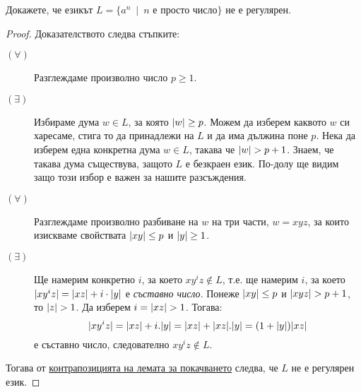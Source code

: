 \begin{extra}
\begin{problem}
  Докажете, че езикът $L = \{a^n\ \mid\ n\mbox{ е просто число}\}$ не е регулярен.
\end{problem}
\begin{proof}
  Доказателството следва стъпките:
  \begin{description}
  \item[$(\forall)$] 
    Разглеждаме произволно число $p \geq 1$.
  \item[$(\exists)$]
    Избираме дума $w \in L$, за която $\vert{w}\vert \geq p$. Можем да изберем каквото $w$ 
    си харесаме, стига то да принадлежи на $L$ и да има дължина поне $p$.
    Нека да изберем една конкретна дума $w \in L$, такава че $\vert{w}\vert > p+1$.
    Знаем, че такава дума съществува, защото $L$ е безкраен език. По-долу ще видим защо този избор е важен за нашите разсъждения.
  \item[$(\forall)$]
    Разглеждаме произволно разбиване на $w$ на три части, $w = xyz$,
    за които изискваме свойствата $\vert{xy}\vert \leq p$ и $\vert{y}\vert \geq 1$.
  \item[$(\exists)$]
    Ще намерим конкретно $i$, за което $xy^iz \not\in L$,
    т.е. ще намерим $i$, за което 
    $\vert{xy^iz}\vert = \vert{xz}\vert + i\cdot\vert{y}\vert$ е {\em съставно число}.
    Понеже $\vert{xy}\vert \leq p$ и $\vert{xyz}\vert > p+1$, то $\vert{z}\vert > 1$.
    Да изберем $i = \vert{xz}\vert > 1$. Тогава:
    \[\vert{xy^iz}\vert = \vert{xz}\vert + i.\vert{y}\vert = \vert{xz}\vert + \vert{xz}\vert.\vert{y}\vert = (1 + \vert{y}\vert)\vert{xz}\vert\] е съставно число, следователно 
    $xy^iz \not\in L$.
  \end{description}
  Тогава от \hyperref[cor:pumping-reg]{контрапозицията на лемата за покачването} следва, че $L$ не е регулярен език.
\end{proof}


\end{extra}
